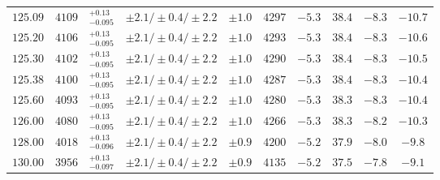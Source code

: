 \begin{table}[ht!]
\begin{center}
\begin{small}
\begin{tabular}{cccccccc|cc}
$125.09$ & $4109$ & $^{+0.13}_{-0.095}$ & $\pm 2.1/\pm 0.4/\pm 2.2$ & $\pm 1.0$ & $4297$ & $-5.3$ & $38.4$ & $-8.3$ & $-10.7$ \\
$125.20$ & $4106$ & $^{+0.13}_{-0.095}$ & $\pm 2.1/\pm 0.4/\pm 2.2$ & $\pm 1.0$ & $4293$ & $-5.3$ & $38.4$ & $-8.3$ & $-10.6$ \\
$125.30$ & $4102$ & $^{+0.13}_{-0.095}$ & $\pm 2.1/\pm 0.4/\pm 2.2$ & $\pm 1.0$ & $4290$ & $-5.3$ & $38.4$ & $-8.3$ & $-10.5$ \\
$125.38$ & $4100$ & $^{+0.13}_{-0.095}$ & $\pm 2.1/\pm 0.4/\pm 2.2$ & $\pm 1.0$ & $4287$ & $-5.3$ & $38.4$ & $-8.3$ & $-10.4$ \\
$125.60$ & $4093$ & $^{+0.13}_{-0.095}$ & $\pm 2.1/\pm 0.4/\pm 2.2$ & $\pm 1.0$ & $4280$ & $-5.3$ & $38.3$ & $-8.3$ & $-10.4$ \\
$126.00$ & $4080$ & $^{+0.13}_{-0.095}$ & $\pm 2.1/\pm 0.4/\pm 2.2$ & $\pm 1.0$ & $4266$ & $-5.3$ & $38.3$ & $-8.2$ & $-10.3$ \\
$128.00$ & $4018$ & $^{+0.13}_{-0.096}$ & $\pm 2.1/\pm 0.4/\pm 2.2$ & $\pm 0.9$ & $4200$ & $-5.2$ & $37.9$ & $-8.0$ & $-9.8 $ \\
$130.00$ & $3956$ & $^{+0.13}_{-0.097}$ & $\pm 2.1/\pm 0.4/\pm 2.2$ & $\pm 0.9$ & $4135$ & $-5.2$ & $37.5$ & $-7.8$ & $-9.1 $ \\
\bottomrule
\end{tabular}%
\end{small}%
\end{center}%
\end{table}

